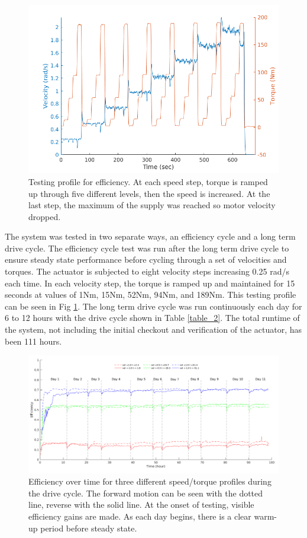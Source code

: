 \begin{figure}[!b]
   \centering
   \includegraphics[width=\linewidth]{images/eff_test_profile_v4}
   \caption{Testing profile for efficiency.
   At each speed step, torque is ramped up through five different levels, then the speed is increased.
   At the last step, the maximum of the supply was reached so motor velocity dropped.}
   \label{eff_profile}
\end{figure}

The system was tested in two separate ways, an efficiency cycle and a long term drive cycle.
The efficiency cycle test was run after the long term drive cycle to ensure steady state performance before cycling through a set of velocities and torques.
The actuator is subjected to eight velocity steps increasing 0.25 rad/s each time.
In each velocity step, the torque is ramped up and maintained for 15 seconds at values of 1Nm, 15Nm, 52Nm, 94Nm, and 189Nm.
This testing profile can be seen in Fig \ref{eff_profile}.
The long term drive cycle was run continuously each day for 6 to 12 hours with the drive cycle shown in Table \ref{table_2}.
The total runtime of the system, not including the initial checkout and verification of the actuator, has been 111 hours.


\begin{figure}[!t]
	\centering
	\includegraphics[width=0.9\linewidth]{images/long_run_plot_v4}
	\caption{Efficiency over time for three different speed/torque profiles during the drive cycle.
		The forward motion can be seen with the dotted line, reverse with the solid line.
		At the onset of testing, visible efficiency gains are made.
		As each day begins, there is a clear warm-up period before steady state.
	}
	\label{long_run}
\end{figure}



